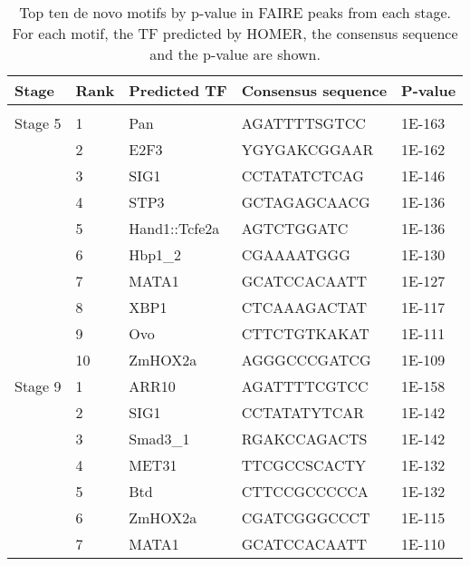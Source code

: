\begin{center}
\begin{longtable}{|l|l|l|l|l|}
\hline
\textbf{Stage}    & \textbf{Rank} & \textbf{Predicted TF}  & \textbf{Consensus sequence} & \textbf{P-value} \\ \hline
\endfirsthead

\caption[Top ten de novo motifs by p-value in FAIRE peaks from each stage. For each motif, the TF predicted by HOMER, the consensus sequence and the p-value are shown.]{Top ten de novo motifs by p-value in FAIRE peaks from each stage. For each motif, the TF predicted by HOMER, the consensus sequence and the p-value are shown.} \label{Table 6.4} \\
\endlastfoot

Stage 5  & 1    & Pan           & AGATTTTSGTCC       & 1E-163  \\ \hline
         & 2    & E2F3          & YGYGAKCGGAAR       & 1E-162  \\ \hline
         & 3    & SIG1          & CCTATATCTCAG       & 1E-146  \\ \hline
         & 4    & STP3          & GCTAGAGCAACG       & 1E-136  \\ \hline
         & 5    & Hand1::Tcfe2a & AGTCTGGATC         & 1E-136  \\ \hline
         & 6    & Hbp1\_2       & CGAAAATGGG         & 1E-130  \\ \hline
         & 7    & MATA1         & GCATCCACAATT       & 1E-127  \\ \hline
         & 8    & XBP1          & CTCAAAGACTAT       & 1E-117  \\ \hline
         & 9    & Ovo           & CTTCTGTKAKAT       & 1E-111  \\ \hline
         & 10   & ZmHOX2a       & AGGGCCCGATCG       & 1E-109  \\ \hline
Stage 9  & 1    & ARR10         & AGATTTTCGTCC       & 1E-158  \\ \hline
         & 2    & SIG1          & CCTATATYTCAR       & 1E-142  \\ \hline
         & 3    & Smad3\_1      & RGAKCCAGACTS       & 1E-142  \\ \hline
         & 4    & MET31         & TTCGCCSCACTY       & 1E-132  \\ \hline
         & 5    & Btd           & CTTCCGCCCCCA       & 1E-132  \\ \hline
         & 6    & ZmHOX2a       & CGATCGGGCCCT       & 1E-115  \\ \hline
         & 7    & MATA1         & GCATCCACAATT       & 1E-110  \\ \hline

\end{longtable}
\end{center}
